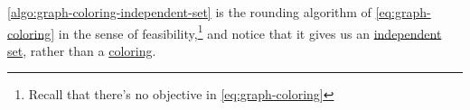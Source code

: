 \begin{remark}
	\autoref{algo:graph-coloring-independent-set} is the rounding algorithm of \autoref{eq:graph-coloring} in the sense of feasibility,\footnote{Recall that there's no objective in \autoref{eq:graph-coloring}} and notice that it gives us an \hyperref[def:independent-set]{independent set}, rather than a \hyperref[def:coloring]{coloring}.
\end{remark}